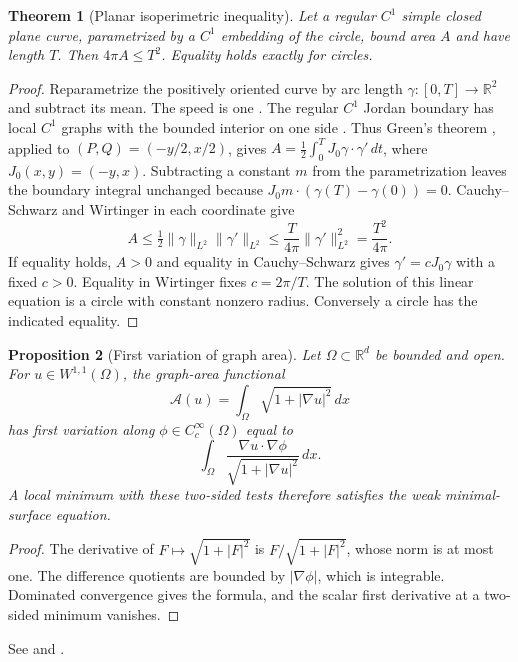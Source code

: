 \documentclass[11pt,oneside,openany]{book}
\theoremstyle{plain}
\newtheorem{theorem}{Theorem}[chapter]
\newtheorem{proposition}[theorem]{Proposition}
\theoremstyle{definition}
\theoremstyle{remark}
\begin{document}
\begin{theorem}[Planar isoperimetric inequality]
\label{thm:v07-08-02}
Let a regular \(C^1\) simple closed plane curve, parametrized by a
\(C^1\) embedding of the circle, bound area \(A\) and have length \(T\).
Then \(4\pi A\le T^2\).
Equality holds exactly for circles.
\end{theorem}
\begin{proof}
Reparametrize the positively oriented curve by arc length
\(\gamma:[0,T]\to\mathbb R^2\) and subtract its mean.
The speed is one \cite[Section 9]{MathGenomeD04}.
The regular \(C^1\) Jordan boundary has local \(C^1\) graphs with the
bounded interior on one side \cite[Chapter 21]{MathGenomeD13}.
Thus Green's theorem \cite[Section 12]{MathGenomeD04}, applied to
\((P,Q)=(-y/2,x/2)\), gives
\(A=\tfrac12\int_0^T J_0\gamma\cdot\gamma'\,dt\), where \(J_0(x,y)=(-y,x)\).
Subtracting a constant \(m\) from the parametrization leaves the boundary
integral unchanged because \(J_0m\cdot(\gamma(T)-\gamma(0))=0\).
Cauchy--Schwarz and Wirtinger in each coordinate give
\[
 A\le\tfrac12\|\gamma\|_{L^2}\|\gamma'\|_{L^2}
    \le \frac{T}{4\pi}\|\gamma'\|_{L^2}^2
    =\frac{T^2}{4\pi}.
\]
If equality holds, \(A>0\) and equality in Cauchy--Schwarz
gives \(\gamma'=cJ_0\gamma\) with a fixed \(c>0\).
Equality in Wirtinger fixes \(c=2\pi/T\). The solution of this
linear equation is a circle with constant nonzero radius.
Conversely a circle has the indicated equality.
\end{proof}

\begin{proposition}[First variation of graph area]
\label{prop:v07-08-03}
Let \(\Omega\subset\mathbb R^d\) be bounded and open.
For \(u\in W^{1,1}(\Omega)\), the graph-area functional
\[
 \mathcal A(u)=\int_\Omega\sqrt{1+|\nabla u|^2}\,dx
\]
has first variation along \(\phi\in C_c^\infty(\Omega)\)
equal to
\[
 \int_\Omega\frac{\nabla u\cdot\nabla\phi}
                   {\sqrt{1+|\nabla u|^2}}\,dx .
\]
A local minimum with these two-sided tests therefore satisfies
the weak minimal-surface equation.
\end{proposition}
\begin{proof}
The derivative of \(F\mapsto\sqrt{1+|F|^2}\) is
\(F/\sqrt{1+|F|^2}\), whose norm is at most one. The difference
quotients are bounded by \(|\nabla\phi|\), which is integrable.
Dominated convergence gives the formula, and the scalar first
derivative at a two-sided minimum vanishes.
\end{proof}

See \cite[Chapters 5--6]{Dacorogna} and
\cite[Section 2.1.1]{Liberzon}.
\end{document}
